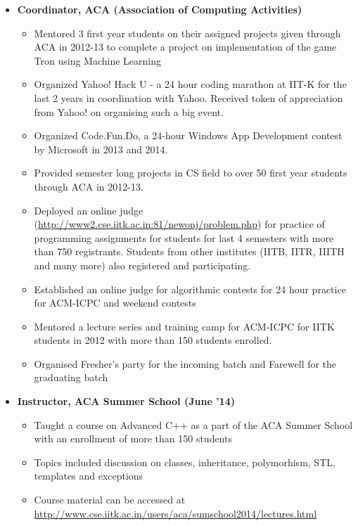 \documentclass[margin,line]{resume}
\begin{document}
\begin{resume}
\begin{itemize}
  \item \textbf{\textsf{Coordinator, ACA (Association of Computing Activities)}}
    \begin{itemize}
      \item Mentored 3 first year students on their assigned projects given through ACA in 2012-13 to complete a project on implementation of the game Tron using Machine Learning
      \item Organized Yahoo! Hack U - a 24 hour coding marathon at IIT-K for the last 2 years in coordination with Yahoo. Received token of appreciation from Yahoo! on organising such a big event.
      \item Organized Code.Fun.Do, a 24-hour Windows App Development contest by Microsoft in 2013 and 2014.
      \item Provided semester long projects in CS field to over 50 first year students through ACA in 2012-13.
      \item Deployed an online judge (\url{http://www2.cse.iitk.ac.in:81/newonj/problem.php}) for practice of programming assignments for students for last 4 semesters with more than 750 registrants. Students from other institutes (IITB, IITR, IIITH and many more) also registered and participating.
      \item Established an online judge for algorithmic contests for 24 hour practice for ACM-ICPC and weekend contests
      \item Mentored a lecture series and training camp for ACM-ICPC for IITK students in 2012 with more than 150 students enrolled.
      \item Organised Fresher’s party for the incoming batch and Farewell for the graduating batch
    \end{itemize}
   
  \item \textbf{\textsf{Instructor, ACA Summer School (June '14)}}
    \begin{itemize}
      \item Taught a course on Advanced C++ as a part of the ACA Summer School with an enrollment of more than 150 students
      \item Topics included discussion on classes, inheritance, polymorhism, STL, templates and exceptions
      \item Course material can be accessed at \url{http://www.cse.iitk.ac.in/users/aca/sumschool2014/lectures.html}
    \end{itemize}


\end{itemize}
\end{resume}
\end{document}
